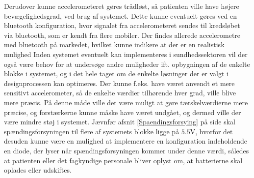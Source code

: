 Derudover kunne accelerometeret gøres trådløst, så patienten ville have højere bevægelighedsgrad, ved brug af systemet. Dette kunne eventuelt gøres ved en bluetooth konfiguration, hvor signalet fra accelerometeret sendes til kredsløbet via bluetooth, som er kendt fra flere mobiler. Der findes allerede accelerometre med bluetooth på markedet, hvilket kunne indikere at der er en realistisk mulighed \cite{Axivity2015, Bioradio2015}
\noindent Inden systemet eventuelt kan implementeres i sundhedssektoren vil der også være behov for at undersøge andre muligheder ift. opbygningen af de enkelte blokke i systemet, og i det hele taget om de enkelte løsninger der er valgt i designprocessen kan optimeres. Der kunne f.eks. have været anvendt et mere sensitivt accelerometer, så de enkelte værdier tilhørende hver grad, ville blive mere præcis. På denne måde ville det være muligt at gøre tærskelværdierne mere præcise, og forstærkerne kunne måske have været undgået, og dermed ville der være mindre støj i systemet. Jævnfør afsnit \ref{Spaendingsforsying} på side \pageref{Spaendingsforsying} skal spændingsforsyningen til flere af systemets blokke ligge på $5.5$V, hvorfor det desuden kunne være en mulighed at implementere en konfiguration indeholdende en diode, der lyser når spændingsforsyningen kommer under denne værdi, således at patienten eller det fagkyndige personale bliver oplyst om, at batterierne skal oplades eller udskiftes. 
  
 
 